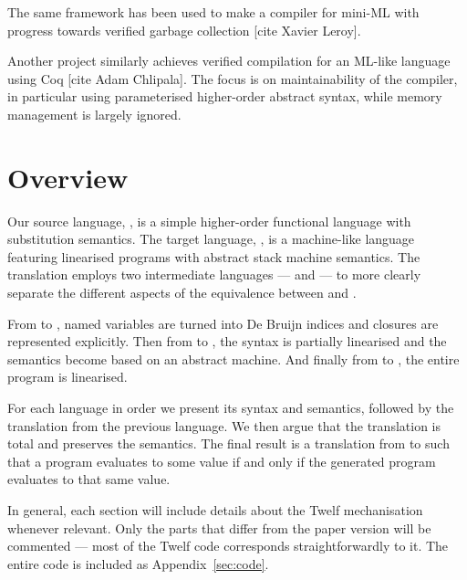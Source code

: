 The same framework has been used to make a compiler for mini-ML with progress towards verified garbage collection [cite Xavier Leroy].

Another project similarly achieves verified compilation for an ML-like language using Coq [cite Adam Chlipala].
The focus is on maintainability of the compiler, in particular using parameterised higher-order abstract syntax, while memory management is largely ignored.




\section{Overview}

Our source language, \hlang, is a simple higher-order functional language with substitution semantics.
The target language, \mlang, is a machine-like language featuring linearised programs with abstract stack machine semantics.
The translation employs two intermediate languages --- \blang and \slang --- to more clearly separate the different aspects of the equivalence between \hlang and \mlang.

From \hlang to \blang, named variables are turned into De Bruijn indices and closures are represented explicitly.
Then from \blang to \slang, the syntax is partially linearised and the semantics become based on an abstract machine.
And finally from \slang to \mlang, the entire program is linearised.

For each language in order we present its syntax and semantics, followed by the translation from the previous language.
We then argue that the translation is total and preserves the semantics.
The final result is a translation from \hlang to \mlang such that a \hlang program evaluates to some value if and only if the generated \mlang program evaluates to that same value.

In general, each section will include details about the Twelf mechanisation whenever relevant.
Only the parts that differ from the paper version will be commented --- most of the Twelf code corresponds straightforwardly to it.
The entire code is included as Appendix~\ref{sec:code}.




